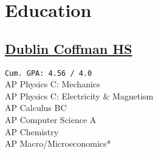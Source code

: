 \documentclass[]{Farhan_Resume_Class}
\begin{document}
%
%
%
%

%
%

\begin{minipage}[t]{0.25\textwidth}

    \section{Education}

    \subsection{\href{https://www.dublinschools.net/Coffman}{Dublin Coffman HS}}
    \texttt{Cum. GPA: 4.56 / 4.0} \\
    AP Physics C: Mechanics \\
    AP Physics C: Electricity \& Magnetism \\
    AP Calculus BC \\
    AP Computer Science A\\
    AP Chemistry\\
    AP Macro/Microeconomics*\\
    \sectionsep

\end{minipage}
\end{document}
